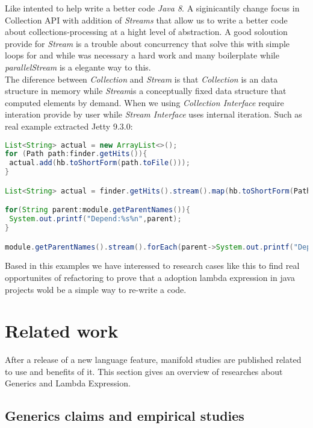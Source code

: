 \documentclass{sig-alternate-05-2015}
\begin{document}
Like intented to help write a better code \textit{Java 8}. A siginicantily change focus in Collection API with addition of \textit{Streams} that allow us to write a better code about collections-processing at a hight level of abstraction. A good soloution provide for \textit{Stream} is a trouble about concurrency that solve this with simple loops for and while was necessary a hard work and many boilerplate while \textit{parallelStream} is a elegante way to this.\\

The diference between \textit{Collection} and \textit{Stream} is that \textit{Collection} is an data structure in memory while \textit{Stream}is a conceptually fixed data structure that computed elements by demand. When we using \textit{Collection Interface} require interation provide by user while \textit{Stream Interface} uses internal iteration. Such as real example extracted Jetty 9.3.0:\\

\begin{lstlisting}[language=java]
List<String> actual = new ArrayList<>(); 
for (Path path:finder.getHits()){
 actual.add(hb.toShortForm(path.toFile()));
}

List<String> actual = finder.getHits().stream().map(hb.toShortForm(Path::toFile)).collect(toList());

for(String parent:module.getParentNames()){
 System.out.printf("Depend:%s%n",parent);
}

module.getParentNames().stream().forEach(parent->System.out.printf("Depend:%s%n",parent));
\end{lstlisting}

Based in this examples we have interessed to research cases like this to find real opportunites of refactoring to prove that a adoption lambda expression in java projects wold be a simple way to re-write a code.\\


\section{Related work}
After a release of a new language feature, manifold studies are published related to use and benefits of it. This section gives an overview of researches about Generics and Lambda Expression.

\subsection{Generics claims and empirical studies}
\end{document}
